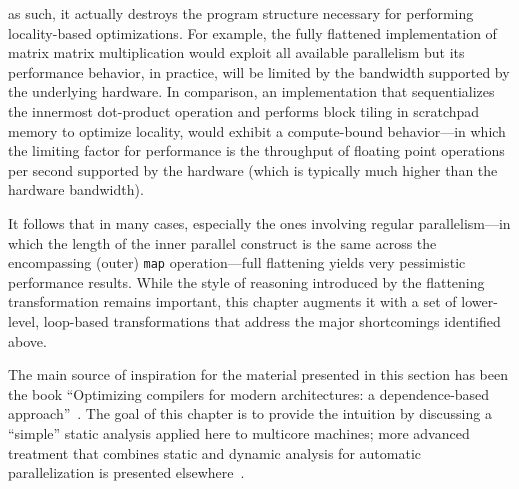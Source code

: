 \documentclass[acmsmall,review]{acmart}\settopmatter{printfolios=true,printccs=false,printacmref=false}
\begin{document}
\begin{itemize}
\begin{itemize}
                as such, it actually destroys the program structure necessary
                for performing locality-based optimizations.
                For example, the fully flattened implementation of matrix
                matrix multiplication would exploit all available parallelism
                but its performance behavior, in practice, will be limited
                by the bandwidth supported by the underlying hardware.
                In comparison, an implementation that sequentializes the 
                innermost dot-product operation and performs block tiling 
                in scratchpad memory to optimize locality, would exhibit 
                a compute-bound behavior---in which the limiting factor 
                for performance is the throughput of floating point 
                operations per second supported by the hardware
                (which is typically much higher than the hardware bandwidth).
        \end{itemize}
\end{itemize}
It follows that in many cases, especially the ones involving regular 
parallelism---in which the length of the inner parallel construct is 
the same across the encompassing (outer) \lstinline{map} operation---full
flattening yields very pessimistic performance results.   While 
the style of reasoning introduced by the flattening transformation 
remains important, this chapter augments it with a set of lower-level,
loop-based transformations that address the major shortcomings
identified above.  

The main source of inspiration for the material presented in this 
section has been the book 
``Optimizing compilers for modern architectures: a dependence-based approach''~\cite{kennedy2001optimizing}. The goal of this chapter is
to provide the intuition by discussing a ``simple'' static analysis
applied here to multicore machines; 
more advanced treatment that combines static and dynamic analysis 
for automatic parallelization is presented 
elsewhere~\cite{OanceaMon,CosPLDI,CIVan,SUIF,Moon99PredArrDataFlow}.
\end{document}
